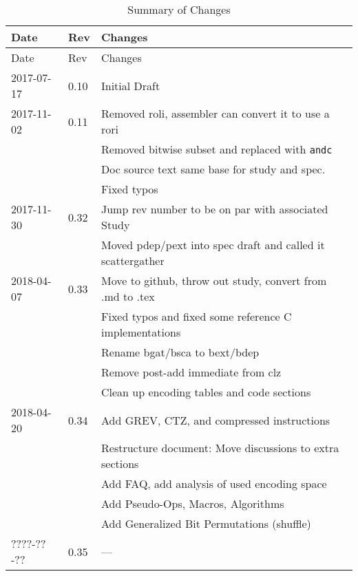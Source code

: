 \documentclass[twoside,11pt]{book}
\begin{document}
\begin{longtable}[c]{@{}lll@{}}
\caption{Summary of Changes}\tabularnewline
\toprule
Date & Rev & Changes\tabularnewline
\midrule
\endfirsthead
\toprule
Date & Rev & Changes\tabularnewline
\midrule
\endhead
2017-07-17 & 0.10 & Initial Draft\tabularnewline
2017-11-02 & 0.11 & Removed roli, assembler can convert it to use a rori\tabularnewline
           &      & Removed bitwise subset and replaced with \texttt{andc}\tabularnewline
           &      & Doc source text same base for study and spec.\tabularnewline
           &      & Fixed typos\tabularnewline
2017-11-30 & 0.32 & Jump rev number to be on par with associated Study\tabularnewline
           &      & Moved pdep/pext into spec draft and called it scattergather\tabularnewline
2018-04-07 & 0.33 & Move to github, throw out study, convert from .md to .tex\tabularnewline
           &      & Fixed typos and fixed some reference C implementations\tabularnewline
           &      & Rename bgat/bsca to bext/bdep\tabularnewline
           &      & Remove post-add immediate from clz\tabularnewline
           &      & Clean up encoding tables and code sections\tabularnewline
2018-04-20 & 0.34 & Add GREV, CTZ, and compressed instructions\tabularnewline
           &      & Restructure document: Move discussions to extra sections\tabularnewline
           &      & Add FAQ, add analysis of used encoding space\tabularnewline
           &      & Add Pseudo-Ops, Macros, Algorithms\tabularnewline
           &      & Add Generalized Bit Permutations (shuffle)\tabularnewline
????-??-?? & 0.35 & ---\tabularnewline
\bottomrule
\end{longtable}

% 
% 
\end{document}
